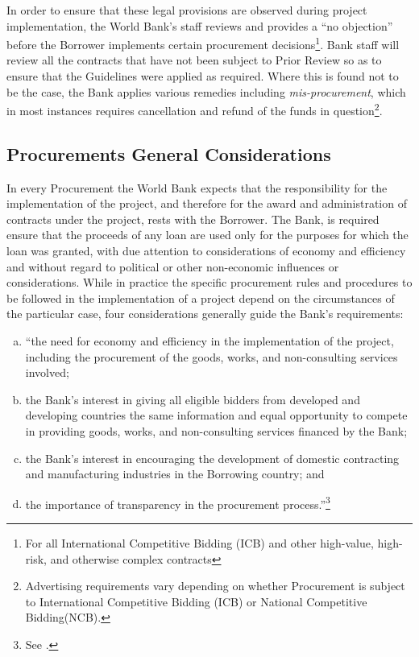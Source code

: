 In order to ensure that these legal provisions are observed during project implementation, the World Bank's staff reviews and provides a ``no objection'' before the Borrower implements certain procurement decisions\footnote{For all International Competitive Bidding (ICB) and other high-value, high-risk, and otherwise complex contracts}. Bank staff will review all the contracts that have not been subject to Prior Review so as to ensure that the Guidelines were applied as required. Where this is found not to be the case, the Bank applies various remedies including \textit{mis-procurement}, which in most instances requires cancellation and refund of the funds in question\footnote{Advertising requirements vary depending on whether Procurement is subject to International Competitive Bidding (ICB) or National Competitive Bidding(NCB).}.


\subsection{Procurements General Considerations}

In every Procurement the World Bank expects that the responsibility for the implementation of the project, and therefore for the award and administration of contracts under the project, rests with the Borrower. The Bank, is required ensure that the proceeds of any loan are used only for the purposes for which the loan was granted, with due attention to considerations of economy and efficiency and without regard to political or other non-economic influences or considerations. While in practice the specific procurement rules and procedures to be followed in the implementation of a project depend on the circumstances of the particular case, four considerations generally guide the Bank's requirements:
\begin{enumerate}[a)]
\item ``the need for economy and efficiency in the implementation of the project, including the procurement of the goods, works, and non-consulting services involved;
\item the Bank's interest in giving all eligible bidders from developed and developing countries the same information and equal opportunity to compete in providing goods, works, and non-consulting services financed by the Bank;
\item  the Bank's interest in encouraging the development of domestic contracting and manufacturing industries in the Borrowing country; and
\item the importance of transparency in the procurement process.''\footnote{See \cite{wb_g_proc}.}
\end{enumerate}


